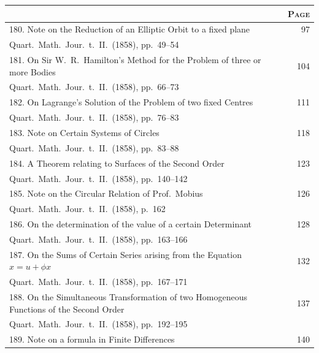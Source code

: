 \documentclass[11pt,a4paper]{book}
\begin{document}
\clearpage

\begin{longtable}{p{}r}
\toprule
\multicolumn{1}{c}{} & \multicolumn{1}{c}{\textsc{Page}} \\
\midrule
\endhead
180. Note on the Reduction of an Elliptic Orbit to a fixed plane \dotfill & 97 \\
\multicolumn{2}{l}{\small Quart.\ Math.\ Jour.\ t.~II.\ (1858), pp.~49--54} \\[0.5em]
%
181. On Sir W.~R.\ Hamilton's Method for the Problem of three or more Bodies \dotfill & 104 \\
\multicolumn{2}{l}{\small Quart.\ Math.\ Jour.\ t.~II.\ (1858), pp.~66--73} \\[0.5em]
%
182. On Lagrange's Solution of the Problem of two fixed Centres \dotfill & 111 \\
\multicolumn{2}{l}{\small Quart.\ Math.\ Jour.\ t.~II.\ (1858), pp.~76--83} \\[0.5em]
%
183. Note on Certain Systems of Circles \dotfill & 118 \\
\multicolumn{2}{l}{\small Quart.\ Math.\ Jour.\ t.~II.\ (1858), pp.~83--88} \\[0.5em]
%
184. A Theorem relating to Surfaces of the Second Order \dotfill & 123 \\
\multicolumn{2}{l}{\small Quart.\ Math.\ Jour.\ t.~II.\ (1858), pp.~140--142} \\[0.5em]
%
185. Note on the Circular Relation of Prof.\ Mobius \dotfill & 126 \\
\multicolumn{2}{l}{\small Quart.\ Math.\ Jour.\ t.~II.\ (1858), p.~162} \\[0.5em]
%
186. On the determination of the value of a certain Determinant \dotfill & 128 \\
\multicolumn{2}{l}{\small Quart.\ Math.\ Jour.\ t.~II.\ (1858), pp.~163--166} \\[0.5em]
%
187. On the Sums of Certain Series arising from the Equation $x = u + \phi x$ \dotfill & 132 \\
\multicolumn{2}{l}{\small Quart.\ Math.\ Jour.\ t.~II.\ (1858), pp.~167--171} \\[0.5em]
%
188. On the Simultaneous Transformation of two Homogeneous Functions of the Second Order \dotfill & 137 \\
\multicolumn{2}{l}{\small Quart.\ Math.\ Jour.\ t.~II.\ (1858), pp.~192--195} \\[0.5em]
%
189. Note on a formula in Finite Differences \dotfill & 140 \\

\end{longtable}
\end{document}
